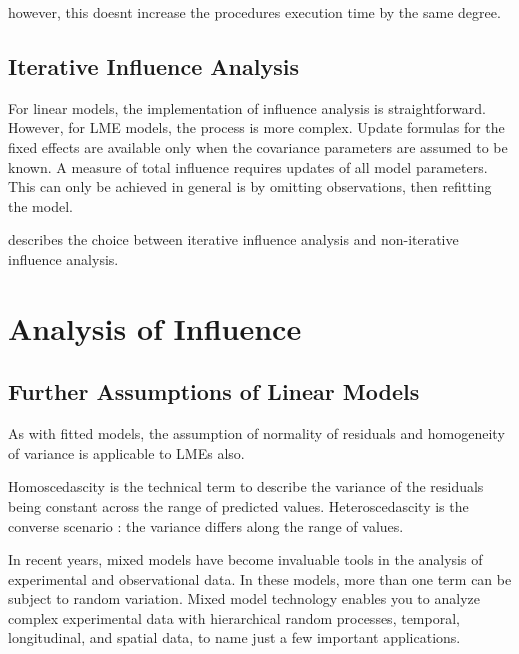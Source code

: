 \documentclass[12pt, a4paper]{article}
\begin{document}
however, this doesnt increase the procedures execution time by the same degree.
\subsection{Iterative Influence Analysis}


For linear models, the implementation of influence analysis is straightforward.
However, for LME models, the process is more complex. Update formulas for the fixed effects are available only when the covariance parameters are assumed to be known. A measure of total influence requires updates of all model parameters.
This can only be achieved in general is by omitting observations, then refitting the model.


\citet{schabenberger} describes the choice between  iterative influence analysis and  non-iterative influence analysis.

\newpage

\section{Analysis of  Influence}



\subsection{Further Assumptions of Linear Models}

As with fitted models, the assumption of normality of residuals and homogeneity of variance is applicable to LMEs also. 



Homoscedascity is the technical term to describe the variance of the residuals being constant across the range of predicted values.
Heteroscedascity is the converse scenario : the variance differs along the range of values.


% 
% 



In recent years, mixed models have become invaluable tools in the analysis of experimental and observational
data. In these models, more than one term can be subject to random variation. Mixed model technology enables you to analyze complex experimental data with hierarchical random processes, temporal,
longitudinal, and spatial data, to name just a few important applications. 
\end{document}
